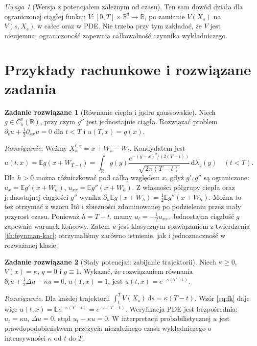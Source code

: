 \documentclass[11pt,a4paper,oneside]{report}
\numberwithin{equation}{chapter}
\theoremstyle{plain}
\theoremstyle{definition}
\newtheorem{zadanie}{Zadanie rozwiązane}[chapter]
\theoremstyle{remark}
\newtheorem{uwaga}{Uwaga}[chapter]
\newcommand{\R}{\mathbb{R}}
\newcommand{\E}{\mathbb{E}}
\newcommand{\dd}{\mathrm{d}}
\begin{document}
\begin{uwaga}[Wersja z potencjałem zależnym od czasu]
Ten sam dowód działa dla ograniczonej ciągłej funkcji
$V:[0,T]\times\R^d\to\R$, po zamianie
$V(X_s)$ na $V(s,X_s)$ w całce oraz w PDE.
Nie trzeba przy tym zakładać, że $V$ jest nieujemna;
ograniczoność zapewnia całkowalność czynnika wykładniczego.
\end{uwaga}

\section{Przykłady rachunkowe i rozwiązane zadania}\label{sec:volIII:07:05}

\begin{zadanie}[Równanie ciepła i jądro gaussowskie]
Niech $g\in C_b^2(\R)$, przy czym $g''$ jest
jednostajnie ciągła. Rozwiązać problem
$\partial_tu+\frac12\partial_{xx}u=0$ dla $t<T$
i $u(T,x)=g(x)$.

\emph{Rozwiązanie.} Weźmy $X_s^{t,x}=x+W_s-W_t$.
Kandydatem jest
\[
u(t,x)=\E g(x+W_{T-t})
=\int_\R g(y)\frac{e^{-(y-x)^2/(2(T-t))}}
{\sqrt{2\pi(T-t)}}\,\dd\lambda_1(y)
\quad(t<T).
\]
Dla $h>0$ można różniczkować pod całką względem $x$,
gdyż $g',g''$ są ograniczone: $u_x=\E g'(x+W_h)$,
$u_{xx}=\E g''(x+W_h)$.
Z własności półgrupy ciepła oraz jednostajnej ciągłości
$g''$ wynika
$\partial_h\E g(x+W_h)=\frac12\E g''(x+W_h)$.
Można to też otrzymać z wzoru Itô i zbieżności
zdominowanej po podzieleniu przez mały przyrost czasu.
Ponieważ $h=T-t$, mamy $u_t=-\frac12u_{xx}$.
Jednostajna ciągłość $g$ zapewnia warunek końcowy.
Zatem $u$ jest klasycznym rozwiązaniem z twierdzenia
\ref{th:feynman-kac}; otrzymaliśmy zarówno istnienie,
jak i jednoznaczność w rozważanej klasie.
\end{zadanie}

\begin{zadanie}[Stały potencjał: zabijanie trajektorii]
Niech $\kappa\ge0$, $V(x)=\kappa$, $q=0$ i $g\equiv1$.
Wykazać, że rozwiązaniem równania
$\partial_tu+\frac12\Delta u-\kappa u=0$,
$u(T,x)=1$, jest $u(t,x)=e^{-\kappa(T-t)}$.

\emph{Rozwiązanie.} Dla każdej trajektorii
$\int_t^TV(X_s)\,\dd s=\kappa(T-t)$.
Wzór \eqref{eq:fk} daje więc
$u(t,x)=\E e^{-\kappa(T-t)}=e^{-\kappa(T-t)}$.
Weryfikacja PDE jest bezpośrednia:
$u_t=\kappa u$, $\Delta u=0$, stąd
$u_t-\kappa u=0$. W interpretacji probabilistycznej
$u$ jest prawdopodobieństwem przeżycia niezależnego
czasu wykładniczego o intensywności $\kappa$ od $t$ do $T$.
\end{zadanie}
\end{document}
